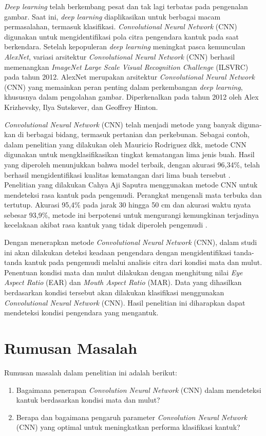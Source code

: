     \textit{Deep learning} telah berkembang pesat dan tak lagi terbatas pada pengenalan gambar. Saat ini, \textit{deep learning} diaplikasikan untuk berbagai macam permasalahan, termasuk klasifikasi. \textit{Convolutional Neural Network} (CNN) digunakan untuk mengidentifikasi pola citra pengendara kantuk pada saat berkendara. 
    Setelah kepopuleran \textit{deep learning} meningkat pasca kemunculan \textit{AlexNet}, variasi arsitektur \textit{Convolutional Neural Network} (CNN) berhasil memenangkan \textit{ImageNet Large Scale Visual Recognition Challenge} (ILSVRC) pada tahun 2012. AlexNet merupakan arsitektur \textit{Convolutional Neural Network} (CNN) yang memainkan peran penting dalam perkembangan \textit{deep learning}, khususnya dalam pengolahan gambar. Diperkenalkan pada tahun 2012 oleh Alex Krizhevsky, Ilya Sutskever, dan Geoffrey Hinton. 
    
    
    \textit{Convolutional Neural Network} (CNN) telah menjadi metode yang banyak diguna-kan di berbagai bidang, termasuk pertanian dan perkebunan. Sebagai contoh, dalam penelitian yang dilakukan oleh Mauricio Rodriguez dkk, metode CNN digunakan untuk mengklasifikasikan tingkat kematangan lima jenis buah. Hasil yang diperoleh menunjukkan bahwa model terbaik, dengan akurasi 96,34\%, telah berhasil mengidentifikasi kualitas kematangan dari lima buah tersebut \cite{Rodriguez2021}. Penelitian yang dilakukan Cahya Aji Saputra menggunakan metode CNN untuk mendeteksi rasa kantuk pada pengemudi. Perangkat mengenali mata terbuka dan tertutup. Akurasi 95,4\% pada jarak 30 hingga 50 cm dan akurasi waktu nyata sebesar 93,9\%, metode ini berpotensi untuk mengurangi kemungkinan terjadinya kecelakaan akibat rasa kantuk yang tidak diperoleh pengemudi \cite{Saputra2021}.

    Dengan menerapkan metode \textit{Convolutional Neural Network} (CNN), dalam studi ini akan dilakukan deteksi keadaan pengendara dengan mengidentifikasi tanda-tanda kantuk pada pengemudi melalui analisis citra dari kondisi mata dan mulut. Penentuan kondisi mata dan mulut dilakukan dengan menghitung nilai 
    \textit{Eye Aspect Ratio} (EAR) dan \textit{Mouth Aspect Ratio} (MAR). Data yang dihasilkan berdasarkan kondisi tersebut akan dilakukan klasifikasi menggunakan \textit{Convolutional Neural Network} (CNN). Hasil penelitian ini diharapkan dapat mendeteksi kondisi pengendara yang mengantuk.

   
\section{Rumusan Masalah}
Rumusan masalah dalam penelitian ini adalah berikut:
\begin{enumerate}

    \item Bagaimana penerapan \textit{Convolution Neural Network} (CNN) dalam mendeteksi kantuk berdasarkan kondisi mata dan mulut?

    \item Berapa dan bagaimana pengaruh parameter \textit{Convolution Neural Network} (CNN) yang optimal untuk meningkatkan performa klasifikasi kantuk?
\end{enumerate}


